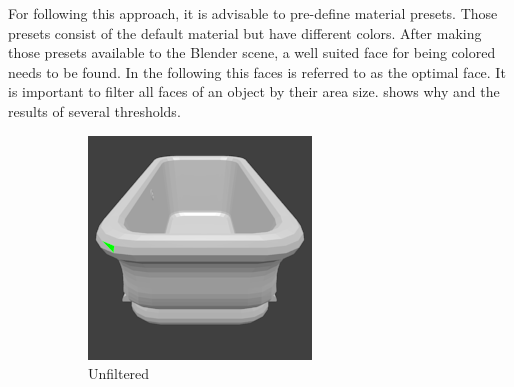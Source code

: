 For following this approach, it is advisable to pre-define material presets.
Those presets consist of the default material but have different colors.
After making those presets available to the Blender scene, a well suited face for being colored needs to be found.
In the following this faces is referred to as the optimal face.
It is important to filter all faces of an object by their area size.
 shows why and the results of several thresholds.
\begin{figure}
	\centering
	\begin{subfigure}{.32\textwidth}
		\centering
		\includegraphics[width=\textwidth]{images/face_area_unfiltered.png}
		\caption{Unfiltered}
		\label{fig:face-area-unfiltered}
	\end{subfigure}
	\begin{subfigure}{.32\textwidth}
		\centering

\end{subfigure}
\end{figure}
